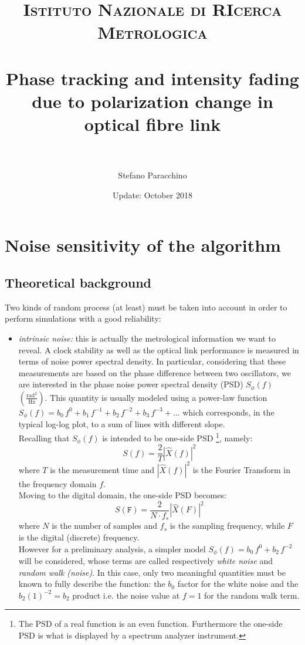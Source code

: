 \documentclass[ fontsize=11pt]{scrartcl} %
\title{	
\normalfont \normalsize 
\textsc{Istituto Nazionale di RIcerca Metrologica } \\ [10pt]
\horrule{0.7pt} \\[0.4cm] %
\huge Phase tracking and intensity fading due to polarization change in optical fibre link \\ %
\horrule{3pt} \\[0.5cm] %
}
\author{Stefano Paracchino} %
\date{Update: October 2018} %
\numberwithin{equation}{section} %
\numberwithin{figure}{section} %
\numberwithin{table}{section} %
\begin{document}
\maketitle
\tableofcontents 
\pagebreak

\section{Noise sensitivity of the algorithm}
\subsection{Theoretical background}

Two kinds of random process  (at least)  must be taken into account in order to perform simulations with a good reliability:

\begin{itemize}
\item \textsl{intrinsic noise:} this is actually the metrological information we want to reveal. A clock stability as well as the optical link performance is measured in terms of noise power spectral density. In particular, considering that these measurements are based on the phase difference between two oscillators, we are interested in the phase noise power spectral density (PSD) $S_{\phi}(f)$ $\left(\frac{\text{rad}^2}{\text{Hz}}\right)$.
This quantity is usually modeled using a power-law function $S_{\phi}(f)=b_0 \, f^{0} + b_1 \, f^{-1}+ b_2 \, f^{-2}+ b_3 \, f^{-3}+...$ which corresponds, in the typical log-log plot, to a sum of lines with different slope.\\
Recalling that $S_{\phi}(f)$ is intended to be one-side PSD \footnote{The PSD of a real function is an even function. Furthermore the one-side PSD is what is displayed by a spectrum analyzer instrument.}, namely:
\begin{equation}
S(f)=\frac{2}{T}\left|\hat{X}(f)\right|^2
\end{equation}
where $T$ is the measurement time and $\left|\hat{X}(f)\right|^2$ is the Fourier Transform in the frequency domain $f$. \\
Moving to the digital domain, the one-side PSD becomes:
\begin{equation}
S(\mathtt{F})=\frac{2}{N\cdot f_s}\left|\hat{X}(F)\right|^2
\end{equation}
where $N$ is the number of samples and $f_s$ is the sampling frequency, while $F$ is the digital (discrete) frequency.\\
However for a preliminary analysis, a simpler model $S_{\phi}(f)=b_0 \, f^{0} + b_2 \, f^{-2}$ will be considered, whose terms are called respectively \textit{white noise}  and \textit{random walk (noise)}.  In this case, only two meaningful quantities must be known to fully describe the function: the $b_0$ factor for the white noise and the $b_2(1)^{-2}=b_2$ product i.e. the noise value at $f=1$ for the random walk term.


\end{itemize}
\end{document}
